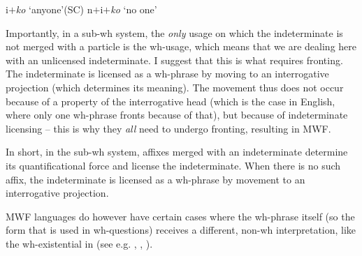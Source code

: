 \documentclass[output=paper,colorlinks,citecolor=brown]{langscibook}
\begin{document}
\ea\label{ex:bosk:16}
\ea i$+$\textit{ko} `anyone'\hfill (SC)
\ex n$+$i$+$\textit{ko} `no one'
\z 
\z 

\noindent Importantly, in a sub-wh system, the \textit{only} usage on which the indeterminate is not merged with a particle is the wh-usage, which means that we are dealing here with an unlicensed indeterminate. I suggest that this is what requires fronting. The indeterminate is licensed as a wh-phrase by moving to an interrogative projection (which determines its meaning). The movement thus does not occur because of a property of the interrogative head (which is the case in English, where only one wh-phrase fronts because of that), but because of indeterminate licensing -- this is why they \textit{all} need to undergo fronting, resulting in MWF.

In short, in the sub-wh system, affixes merged with an indeterminate determine its quantificational force and license the indeterminate. When there is no such affix, the indeterminate is licensed as a wh-phrase by movement to an interrogative projection.

MWF languages do however have certain cases where the wh-phrase itself (so the form that is used in wh-questions) receives a different, non-wh interpretation, like the wh-existential in  (see e.g. \citealt{Izvorski1998}, \citealt{Bošković2002}, \citealt{Šimík2011}).

 
\ea\label{ex:bosk:17}
\z 
\z 
\end{document}

